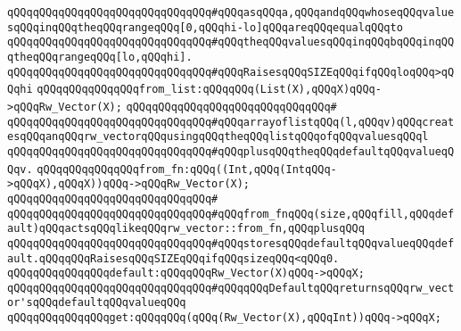 \verb|qQQqqQQqqQQqqQQqqQQqqQQqqQQqqQQq#qQQqasqQQqa,qQQqandqQQqwhoseqQQqvaluesqQQqinqQQqtheqQQqrangeqQQq[0,qQQqhi-lo]qQQqareqQQqequalqQQqto|\newline
\verb|qQQqqQQqqQQqqQQqqQQqqQQqqQQqqQQq#qQQqtheqQQqvaluesqQQqinqQQqbqQQqinqQQqtheqQQqrangeqQQq[lo,qQQqhi].|\newline
\verb|qQQqqQQqqQQqqQQqqQQqqQQqqQQqqQQq#qQQqRaisesqQQqSIZEqQQqifqQQqloqQQq>qQQqhi|\newline
\newline
\newline
\newline
\verb|qQQqqQQqqQQqqQQqfrom_list:qQQqqQQq(List(X),qQQqX)qQQq->qQQqRw_Vector(X);|\newline
\verb|qQQqqQQqqQQqqQQqqQQqqQQqqQQqqQQq#|\newline
\verb|qQQqqQQqqQQqqQQqqQQqqQQqqQQqqQQq#qQQqarrayoflistqQQq(l,qQQqv)qQQqcreatesqQQqanqQQqrw_vectorqQQqusingqQQqtheqQQqlistqQQqofqQQqvaluesqQQql|\newline
\verb|qQQqqQQqqQQqqQQqqQQqqQQqqQQqqQQq#qQQqplusqQQqtheqQQqdefaultqQQqvalueqQQqv.|\newline
\newline
\newline
\newline
\verb|qQQqqQQqqQQqqQQqfrom_fn:qQQq((Int,qQQq(IntqQQq->qQQqX),qQQqX))qQQq->qQQqRw_Vector(X);|\newline
\verb|qQQqqQQqqQQqqQQqqQQqqQQqqQQqqQQq#|\newline
\verb|qQQqqQQqqQQqqQQqqQQqqQQqqQQqqQQq#qQQqfrom_fnqQQq(size,qQQqfill,qQQqdefault)qQQqactsqQQqlikeqQQqrw_vector::from_fn,qQQqplusqQQq|\newline
\verb|qQQqqQQqqQQqqQQqqQQqqQQqqQQqqQQq#qQQqstoresqQQqdefaultqQQqvalueqQQqdefault.qQQqqQQqRaisesqQQqSIZEqQQqifqQQqsizeqQQq<qQQq0.|\newline
\newline
\newline
\newline
\verb|qQQqqQQqqQQqqQQqdefault:qQQqqQQqRw_Vector(X)qQQq->qQQqX;|\newline
\newline
\verb|qQQqqQQqqQQqqQQqqQQqqQQqqQQqqQQq#qQQqqQQqDefaultqQQqreturnsqQQqrw_vector'sqQQqdefaultqQQqvalueqQQq|\newline
\newline
\newline
\newline
\verb|qQQqqQQqqQQqqQQqget:qQQqqQQq(qQQq(Rw_Vector(X),qQQqInt))qQQq->qQQqX;|\newline
